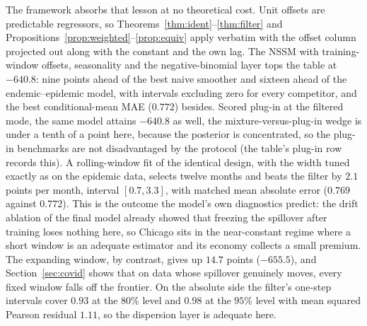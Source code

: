 \documentclass[12pt]{article}
\theoremstyle{plain}
\theoremstyle{definition}
\theoremstyle{remark}
\begin{document}
The framework absorbs that lesson at no theoretical cost. Unit offsets are predictable regressors, so Theorems~\ref{thm:ident}--\ref{thm:filter} and Propositions~\ref{prop:weighted}--\ref{prop:equiv} apply verbatim with the offset column projected out along with the constant and the own lag. The NSSM with training-window offsets, seasonality and the negative-binomial layer tops the table at $-640.8$: nine points ahead of the best naive smoother and sixteen ahead of the endemic--epidemic model, with intervals excluding zero for every competitor, and the best conditional-mean MAE ($0.772$) besides. Scored plug-in at the filtered mode, the same model attains $-640.8$ as well, the mixture-versus-plug-in wedge is under a tenth of a point here, because the posterior is concentrated, so the plug-in benchmarks are not disadvantaged by the protocol (the table's plug-in row records this). A rolling-window fit of the identical design, with the width tuned exactly as on the epidemic data, selects twelve months and beats the filter by $2.1$ points per month, interval $[0.7,3.3]$, with matched mean absolute error ($0.769$ against $0.772$). This is the outcome the model's own diagnostics predict: the drift ablation of the final model already showed that freezing the spillover after training loses nothing here, so Chicago sits in the near-constant regime where a short window is an adequate estimator and its economy collects a small premium. The expanding window, by contrast, gives up $14.7$ points ($-655.5$), and Section~\ref{sec:covid} shows that on data whose spillover genuinely moves, every fixed window falls off the frontier. On the absolute side the filter's one-step intervals cover $0.93$ at the $80\%$ level and $0.98$ at the $95\%$ level with mean squared Pearson residual $1.11$, so the dispersion layer is adequate here.
\end{document}
